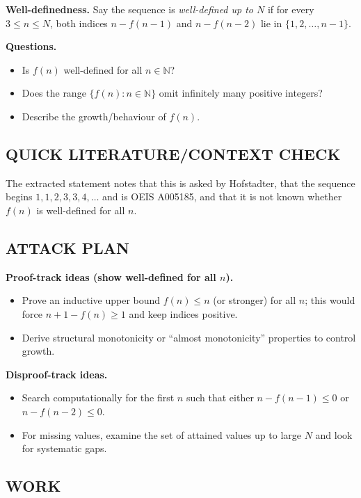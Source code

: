 \textbf{Well-definedness.} Say the sequence is \emph{well-defined up to $N$} if for every $3\le n\le N$, both indices $n-f(n-1)$ and $n-f(n-2)$ lie in $\{1,2,\dots,n-1\}$.

\textbf{Questions.}
\begin{itemize}
\item[(Q1)] Is $f(n)$ well-defined for all $n\in\mathbb{N}$?
\item[(Q2)] Does the range $\{f(n): n\in\mathbb{N}\}$ omit infinitely many positive integers?
\item[(Q3)] Describe the growth/behaviour of $f(n)$.
\end{itemize}

\subsection*{QUICK LITERATURE/CONTEXT CHECK}
The extracted statement notes that this is asked by Hofstadter, that the sequence begins $1,1,2,3,3,4,\dots$ and is OEIS A005185, and that it is not known whether $f(n)$ is well-defined for all $n$.

\subsection*{ATTACK PLAN}
\textbf{Proof-track ideas (show well-defined for all $n$).}
\begin{itemize}
\item Prove an inductive upper bound $f(n)\le n$ (or stronger) for all $n$; this would force $n+1-f(n)\ge 1$ and keep indices positive.
\item Derive structural monotonicity or ``almost monotonicity'' properties to control growth.
\end{itemize}
\textbf{Disproof-track ideas.}
\begin{itemize}
\item Search computationally for the first $n$ such that either $n-f(n-1)\le 0$ or $n-f(n-2)\le 0$.
\item For missing values, examine the set of attained values up to large $N$ and look for systematic gaps.
\end{itemize}

\subsection*{WORK}
